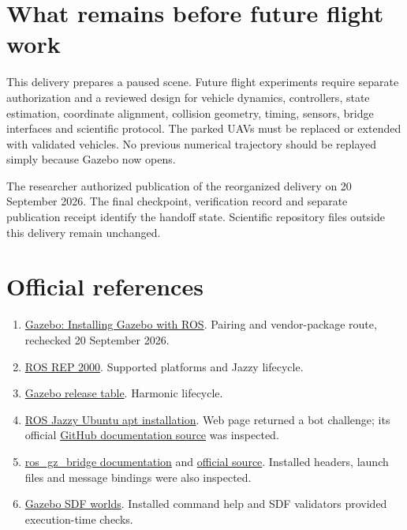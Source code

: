 \section{What remains before future flight work}
This delivery prepares a paused scene. Future flight experiments require separate authorization and a reviewed design for vehicle dynamics, controllers, state estimation, coordinate alignment, collision geometry, timing, sensors, bridge interfaces and scientific protocol. The parked UAVs must be replaced or extended with validated vehicles. No previous numerical trajectory should be replayed simply because Gazebo now opens.

The researcher authorized publication of the reorganized delivery on 20 September 2026. The final checkpoint, verification record and separate publication receipt identify the handoff state. Scientific repository files outside this delivery remain unchanged.

\section*{Official references}
\begin{enumerate}
\item \href{https://gazebosim.org/docs/harmonic/ros_installation/}{Gazebo: Installing Gazebo with ROS}. Pairing and vendor-package route, rechecked 20 September 2026.
\item \href{https://www.ros.org/reps/rep-2000.html}{ROS REP 2000}. Supported platforms and Jazzy lifecycle.
\item \href{https://gazebosim.org/docs/harmonic/releases/}{Gazebo release table}. Harmonic lifecycle.
\item \href{https://docs.ros.org/en/jazzy/Installation/Ubuntu-Install-Debs.html}{ROS Jazzy Ubuntu apt installation}. Web page returned a bot challenge; its official \href{https://github.com/ros2/ros2_documentation/tree/jazzy/source/Installation}{GitHub documentation source} was inspected.
\item \href{https://docs.ros.org/en/jazzy/p/ros_gz_bridge/}{ros\_gz\_bridge documentation} and \href{https://github.com/gazebosim/ros_gz/tree/jazzy}{official source}. Installed headers, launch files and message bindings were also inspected.
\item \href{https://gazebosim.org/docs/harmonic/sdf_worlds/}{Gazebo SDF worlds}. Installed command help and SDF validators provided execution-time checks.
\end{enumerate}

